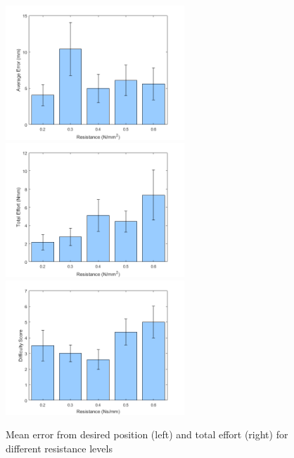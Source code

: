\documentclass[12pt]{report}
\begin{document}
\begin{figure}[p]
	\centering
	\includegraphics[width=0.6\textwidth]{err_resist}
	\includegraphics[width=0.6\textwidth]{eff_resist}
	\includegraphics[width=0.6\textwidth]{diff_resist}
	\caption{Mean error from desired position (left) and total effort (right) for different resistance levels}
	\label{fig:resist}
\end{figure}		


\end{document}
